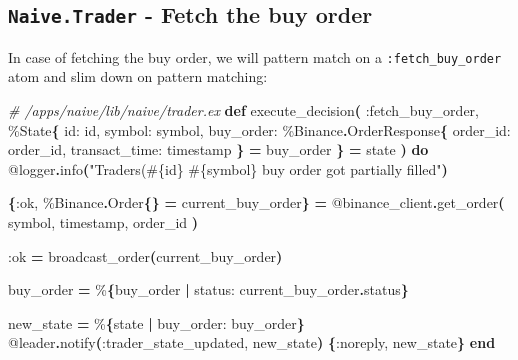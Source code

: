 \documentclass[
  oneside]{book}
\newenvironment{Shaded}{\begin{snugshade}}{\end{snugshade}}
\newcommand{\CommentTok}[1]{\textcolor[rgb]{0.56,0.35,0.01}{\textit{#1}}}
\newcommand{\ConstantTok}[1]{\textcolor[rgb]{0.56,0.35,0.01}{#1}}
\newcommand{\FunctionTok}[1]{\textcolor[rgb]{0.13,0.29,0.53}{\textbf{#1}}}
\newcommand{\KeywordTok}[1]{\textcolor[rgb]{0.13,0.29,0.53}{\textbf{#1}}}
\newcommand{\NormalTok}[1]{#1}
\newcommand{\OperatorTok}[1]{\textcolor[rgb]{0.81,0.36,0.00}{\textbf{#1}}}
\newcommand{\OtherTok}[1]{\textcolor[rgb]{0.56,0.35,0.01}{#1}}
\newcommand{\StringTok}[1]{\textcolor[rgb]{0.31,0.60,0.02}{#1}}
\newcommand{\VariableTok}[1]{\textcolor[rgb]{0.00,0.00,0.00}{#1}}
\begin{document}
\subsection{\texorpdfstring{\texttt{Naive.Trader} - Fetch the buy order}{Naive.Trader - Fetch the buy order}}\label{naive.trader---fetch-the-buy-order}

In case of fetching the buy order, we will pattern match on a \texttt{:fetch\_buy\_order} atom and slim down on pattern matching:

\begin{Shaded}
\begin{Highlighting}[]
\CommentTok{\# /apps/naive/lib/naive/trader.ex}
  \KeywordTok{def}\NormalTok{ execute\_decision}\FunctionTok{(}
         \VariableTok{:fetch\_buy\_order}\NormalTok{,}
\NormalTok{         \%}\ConstantTok{State}\FunctionTok{\{}
           \VariableTok{id:}\NormalTok{ id,}
           \VariableTok{symbol:}\NormalTok{ symbol,}
           \VariableTok{buy\_order:}
\NormalTok{             \%}\ConstantTok{Binance}\OperatorTok{.}\ConstantTok{OrderResponse}\FunctionTok{\{}
               \VariableTok{order\_id:}\NormalTok{ order\_id,}
               \VariableTok{transact\_time:}\NormalTok{ timestamp}
             \FunctionTok{\}} \OperatorTok{=}\NormalTok{ buy\_order}
         \FunctionTok{\}} \OperatorTok{=}\NormalTok{ state}
       \FunctionTok{)} \KeywordTok{do}
    \OtherTok{@logger}\OperatorTok{.}\NormalTok{info}\FunctionTok{(}\StringTok{"Trader\textquotesingle{}s(}\OtherTok{\#\{}\NormalTok{id}\OtherTok{\}}\StringTok{ }\OtherTok{\#\{}\NormalTok{symbol}\OtherTok{\}}\StringTok{ buy order got partially filled"}\FunctionTok{)}

    \FunctionTok{\{}\VariableTok{:ok}\NormalTok{, \%}\ConstantTok{Binance}\OperatorTok{.}\ConstantTok{Order}\FunctionTok{\{\}} \OperatorTok{=}\NormalTok{ current\_buy\_order}\FunctionTok{\}} \OperatorTok{=}
      \OtherTok{@binance\_client}\OperatorTok{.}\NormalTok{get\_order}\FunctionTok{(}
\NormalTok{        symbol,}
\NormalTok{        timestamp,}
\NormalTok{        order\_id}
      \FunctionTok{)}

    \VariableTok{:ok} \OperatorTok{=}\NormalTok{ broadcast\_order}\FunctionTok{(}\NormalTok{current\_buy\_order}\FunctionTok{)}

\NormalTok{    buy\_order }\OperatorTok{=}\NormalTok{ \%}\FunctionTok{\{}\NormalTok{buy\_order }\OperatorTok{|} \VariableTok{status:}\NormalTok{ current\_buy\_order}\OperatorTok{.}\NormalTok{status}\FunctionTok{\}}

\NormalTok{    new\_state }\OperatorTok{=}\NormalTok{ \%}\FunctionTok{\{}\NormalTok{state }\OperatorTok{|} \VariableTok{buy\_order:}\NormalTok{ buy\_order}\FunctionTok{\}}
    \OtherTok{@leader}\OperatorTok{.}\NormalTok{notify}\FunctionTok{(}\VariableTok{:trader\_state\_updated}\NormalTok{, new\_state}\FunctionTok{)}
    \FunctionTok{\{}\VariableTok{:noreply}\NormalTok{, new\_state}\FunctionTok{\}}
  \KeywordTok{end}
\end{Highlighting}
\end{Shaded}
\end{document}
